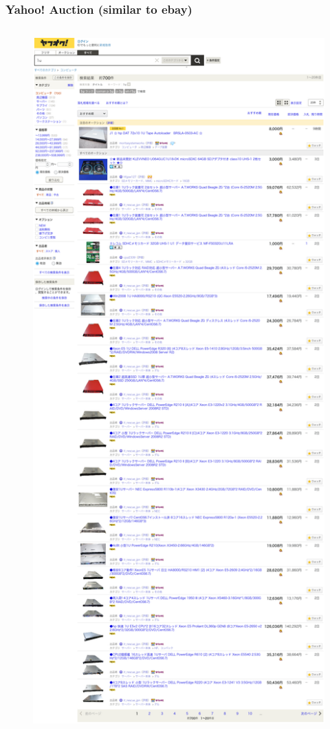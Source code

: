 \documentclass[aspectratio=169,11pt,hyperref={colorlinks=true}]{beamer}
\begin{document}
\begin{frame}
  \frametitle{Yahoo! Auction (similar to ebay)}
  \begin{columns}[T]
    \begin{column}{0.45\textwidth}
      \begin{figure}
        \begin{center}
          \includegraphics[width=1.0\textwidth]{yahoo_auction_1u.png}

\end{center}
\end{figure}
\end{column}
\end{columns}
\end{frame}
\end{document}

